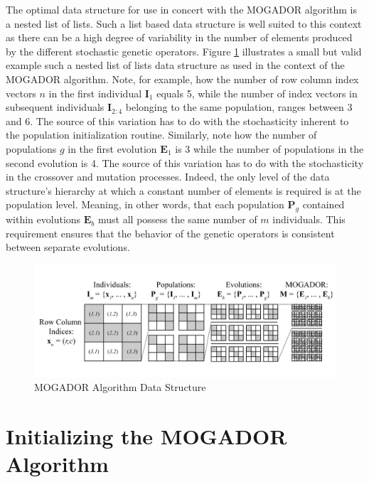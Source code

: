 The optimal data structure for use in concert with the MOGADOR algorithm is a nested list of lists. Such a list based data structure is well suited to this context as there can be a high degree of variability in the number of elements produced by the different stochastic genetic operators. Figure \ref{fig:data-structure} illustrates a small but valid example such a nested list of lists data structure as used in the context of the MOGADOR algorithm. Note, for example, how the number of row column index vectors $n$ in the first individual $\textbf{I}_1$ equals 5, while the number of index vectors in subsequent individuals $\textbf{I}_{2:4}$ belonging to the same population, ranges between 3 and 6. The source of this variation has to do with the stochasticity inherent to the population initialization routine. Similarly, note how the number of populations $g$ in the first evolution $\textbf{E}_1$ is 3 while the number of populations in the second evolution is 4. The source of this variation has to do with the stochasticity in the crossover and mutation processes. Indeed, the only level of the data structure's hierarchy at which a constant number of elements is required is at the population level. Meaning, in other words, that each population $\textbf{P}_g$ contained within evolutions $\textbf{E}_b$ must all possess the same number of $m$ individuals. This requirement ensures that the behavior of the genetic operators is consistent between separate evolutions.
            
            \begin{figure}[!h]
            \centering
            \includegraphics[width=5.5in]{figures/data-structure.png}   
            \caption[MOGADOR Algorithm Data Structure]{MOGADOR Algorithm Data Structure}
            \label{fig:data-structure}
            \end{figure}

\section{Initializing the MOGADOR Algorithm}
    

